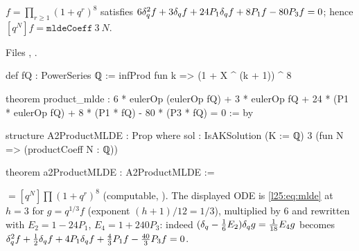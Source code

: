 \begin{theorem}[$A_2$: the product solves the $h=3$ recurrence]\label{l25:thm:a2prod}
$f=\prod_{r\ge1}(1+q^r)^8$ satisfies $6\delta_q^2f+3\delta_q f+24P_1\delta_q f+8P_1f-80P_3f=0$; hence
$[q^N]f=\mathtt{mldeCoeff}\ 3\ N$.
\end{theorem}
\noindent Files ,
.
\begin{leancode}
def fQ : PowerSeries ℚ := infProd fun k => (1 + X ^ (k + 1)) ^ 8

theorem product_mlde :
    6 * eulerOp (eulerOp fQ) + 3 * eulerOp fQ + 24 * (P1 * eulerOp fQ) + 8 * (P1 * fQ)
      - 80 * (P3 * fQ) = 0 := by

structure A2ProductMLDE : Prop where
  sol : IsAKSolution (K := ℚ) 3 (fun N => (productCoeff N : ℚ))

theorem a2ProductMLDE : A2ProductMLDE :=
\end{leancode}
\begin{dictionary}
 $=[q^N]\prod(1+q^r)^8$ (computable, ). The displayed ODE is
\eqref{l25:eq:mlde} at $h=3$ for $g=q^{1/3}f$ (exponent $(h+1)/12=1/3$), multiplied by $6$ and rewritten with
$E_2=1-24P_1$, $E_4=1+240P_3$: indeed $(\delta_q-\frac16E_2)\delta_q g=\frac1{18}E_4g$ becomes
$\delta_q^2f+\frac12\delta_q f+4P_1\delta_q f+\frac43P_1f-\frac{40}3P_3f=0$.
\end{dictionary}
